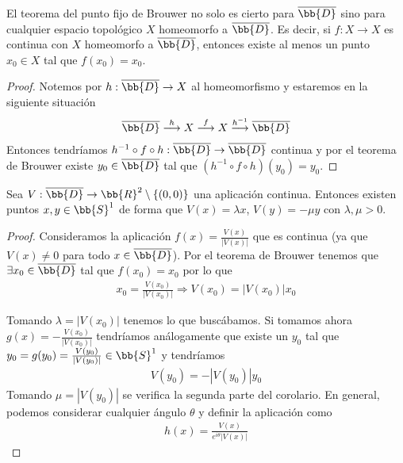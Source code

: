 \begin{observacion}
    El teorema del punto fijo de Brouwer no solo es cierto para $\overline{\bb{D}}$ sino para cualquier espacio topológico $X$ homeomorfo a $\overline{\bb{D}}$. Es decir, si $f:X\to X$ es continua con $X$ homeomorfo a $\overline{\bb{D}}$, entonces existe al menos un punto $x_0\in X$ tal que $f(x_0)=x_0$.

    \begin{proof}
        Notemos por $h:\overline{\bb{D}}\to X$ al homeomorfismo y estaremos en la siguiente situación
        \begin{gather*}
            \overline{\bb{D}} \overset{h}{\longrightarrow} X \overset{f}{\longrightarrow} X \overset{h^{-1}}{\longrightarrow} \overline{\bb{D}}
        \end{gather*}
        Entonces tendríamos $h^{-1}\circ f \circ h : \overline{\bb{D}} \to \overline{\bb{D}}$ continua y por el teorema de Brouwer existe $y_0\in \overline{\bb{D}}$ tal que $(h^{-1}\circ f \circ h)(y_0) = y_0$.
    \end{proof}
\end{observacion}

\begin{coro}
    Sea $V:\overline{\bb{D}}\to \bb{R}^2 \setminus \{(0,0)\}$ una aplicación continua. Entonces existen puntos $x,y\in \bb{S}^1$ de forma que $V(x) = \lambda x$, $V(y) = -\mu y$ con $\lambda, \mu >0$.

    \begin{proof}
        Consideramos la aplicación $f(x) = \frac{V(x)}{|V(x)|}$ que es continua (ya que $V(x)\neq 0$ para todo $x\in \overline{{\bb{D}}}$). Por el teorema de Brouwer tenemos que $\exists x_0\in \overline{\bb{D}}$ tal que $f(x_0) = x_0$ por lo que 
        \begin{gather*}
            x_0 = \frac{V(x_0)}{|V(x_0)|} \Rightarrow V(x_0) = |V(x_0)|x_0
        \end{gather*}
        
        Tomando $\lambda = |V(x_0)|$ tenemos lo que buscábamos. Si tomamos ahora $g(x) = - \frac{V(x_0)}{|V(x_0)|}$ tendríamos análogamente que existe un $y_0$ tal que $y_0 = g(y_0) = \frac{V(y_0)}{|V(y_0)|}\in \bb{S}^1$ y tendríamos
        \begin{gather*}
            V(y_0) = -|V(y_0)|y_0
        \end{gather*}
        Tomando $\mu = |V(y_0)|$ se verifica la segunda parte del corolario. En general, podemos considerar cualquier ángulo $\theta$ y definir la aplicación como
        \begin{gather*}
            h(x) = \frac{V(x)}{e^{i\theta} |V(x)|}
        \end{gather*}
    \end{proof}
\end{coro}

